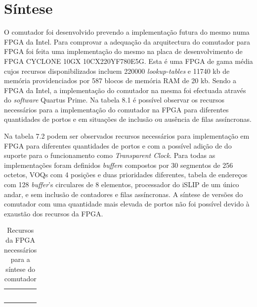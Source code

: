 \section{Síntese}

O comutador foi desenvolvido prevendo a implementação futura do mesmo numa FPGA da Intel. Para comprovar a adequação da arquitectura do comutador para FPGA foi feita uma implementação do mesmo na placa de desenvolvimento de FPGA CYCLONE 10GX 10CX220YF780E5G. Esta é uma FPGA de gama média cujos recursos disponibilizados incluem 220000 \textit{lookup-tables} e 11740 kb de memória providenciados por 587 blocos de memória RAM de 20 kb. Sendo a FPGA da Intel, a implementação do comutador na mesma foi efectuada através do \textit{software} Quartus Prime. Na tabela 8.1 é possível observar os recursos necessários para a implementação do comutador na FPGA para diferentes quantidades de portos e em situações de inclusão ou ausência de filas assíncronas. \par   


Na tabela 7.2 podem ser observados recursos necessários para implementação em FPGA para diferentes quantidades de portos e com a possível adição de do suporte para o funcionamento como \textit{Transparent Clock}. Para todas as implementações foram definidos \textit{buffer}s compostos por 30 segmentos de 256 octetos, VOQs com 4 posições e duas prioridades diferentes, tabela de endereços com 128 \textit{buffer}'s circulares de 8 elementos, processador do iSLIP de um único andar, e sem inclusão de contadores e filas assíncronas. A síntese de versões do comutador com uma quantidade mais elevada de portos não foi possível devido à exaustão dos recursos da FPGA.

\begin{table}[h]
\begin{center}
\begin{tabular}{|l|l|}

    \hline
    &    \\
    \hline
     & \\
    \hline
     &   \\
    \hline
     &   \\
    \hline
     &  \\
    \hline
     &  \\
    \hline
    
\end{tabular}
\end{center}
\caption{Recursos da FPGA necessários para a síntese do comutador}\label{Recursos da FPGA necessários para a síntese do comutador}
\end{table}
